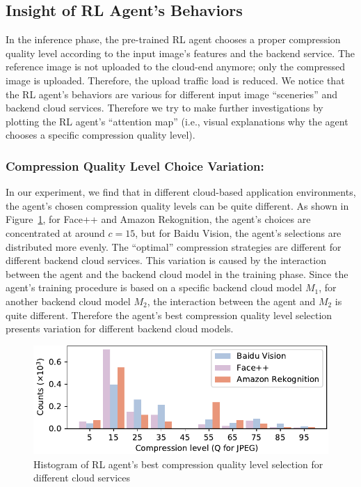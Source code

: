 \subsection{Insight of RL Agent's Behaviors}
\label{subsec:insight}

In the inference phase, the pre-trained RL agent chooses a proper compression quality level according to the input image's features and the backend service. The reference image is not uploaded to the cloud-end anymore; only the compressed image is uploaded. Therefore, the upload traffic load is reduced. We notice that the RL agent's behaviors are various for different input image ``sceneries'' and backend cloud services. Therefore we try to make further investigations by plotting the RL agent's ``attention map'' (i.e., visual explanations why the agent chooses a specific compression quality level). %

\subsubsection{Compression Quality Level Choice Variation:}

In our experiment, we find that in different cloud-based application environments, the agent's chosen compression quality levels can be quite different. As shown in Figure~\ref{fig: quality_chosen}, for Face++ and Amazon Rekognition, the agent's choices are concentrated at around $ c=15 $, but for Baidu Vision, the agent's selections are distributed more evenly. The ``optimal'' compression strategies are different for different backend cloud services. This variation is caused by the interaction between the agent and the backend cloud model in the training phase. Since the agent's training procedure is based on a specific backend cloud model $ M_1 $, for another backend cloud model $ M_2 $, the interaction between the agent and $ M_2 $ is quite different. Therefore the agent's best compression quality level selection presents variation for different backend cloud models.  

\begin{figure}[!t]
	\includegraphics[width=0.8\linewidth]{figures/quality_chosen.pdf}
	\caption{Histogram of RL agent's best compression quality level selection for different cloud services}
	\label{fig: quality_chosen}
\end{figure}

